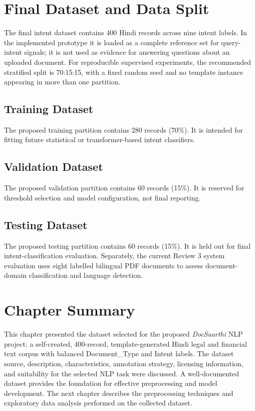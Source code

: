 \section{Final Dataset and Data Split}

The final intent dataset contains 400 Hindi records across nine intent labels. In the implemented prototype it is loaded as a complete reference set for query-intent signals; it is not used as evidence for answering questions about an uploaded document. For reproducible supervised experiments, the recommended stratified split is 70:15:15, with a fixed random seed and no template instance appearing in more than one partition.

\subsection{Training Dataset}
The proposed training partition contains 280 records (70\%). It is intended for fitting future statistical or transformer-based intent classifiers.

\subsection{Validation Dataset}
The proposed validation partition contains 60 records (15\%). It is reserved for threshold selection and model configuration, not final reporting.

\subsection{Testing Dataset}
The proposed testing partition contains 60 records (15\%). It is held out for final intent-classification evaluation. Separately, the current Review 3 system evaluation uses eight labelled bilingual PDF documents to assess document-domain classification and language detection.


\section*{Chapter Summary}

This chapter presented the dataset selected for the proposed \textit{DocSaarthi} NLP project: a self-created, 400-record, template-generated Hindi legal and financial text corpus with balanced Document\_Type and Intent labels. The dataset source, description, characteristics, annotation strategy, licensing information, and suitability for the selected NLP task were discussed. A well-documented dataset provides the foundation for effective preprocessing and model development. The next chapter describes the preprocessing techniques and exploratory data analysis performed on the collected dataset.
